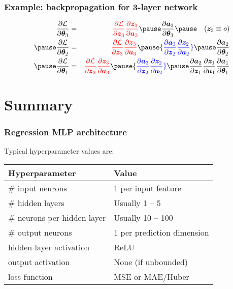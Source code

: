 \documentclass[smaller]{beamer}
\begin{document}
\begin{frame}
  \frametitle{Example: backpropagation for 3-layer network}
  \pause
{}
\pause
\vspace{-2ex}
\begin{eqnarray}
  \pd{\mc{L}}{\bm\th_{3}} &=&  {\rd \pd{\mc{L}}{\bm z_{3}}\pd{\bm z_{3}}{\bm a_{3}}}\pause \pd{\bm a_{3}}{\bm\th_{3}}
\pe \quad (\bm z_{3} \equiv o)
  \\\pause
\pd{\mc{L}}{\bm\th_{2}} &=&  {\rd \pd{\mc{L}}{\bm z_{3}}\pd{\bm z_{3}}{\bm a_{3}}} \pause {\bl \pd{\bm a_{3}}{\bm z_{2}}\pd{\bm z_{2}}{\bm a_{2}}} \pause                   
                    \pd{\bm a_{2}}{\bm\th_{2}}\\\pause  
\pd{\mc{L}}{\bm\th_{1}} &=&  {\rd \pd{\mc{L}}{\bm z_{3}}\pd{\bm z_{3}}{\bm a_{3}}} \pause {\bl \pd{\bm a_{3}}{\bm z_{2}}\pd{\bm z_{2}}{\bm a_{2}}} \pause                   
                    \pd{\bm a_{2}}{\bm z_{1}}                          
                    \pd{\bm z_{1}}{\bm a_{1}}\pd{\bm a_{1}}{\bm\th_{1}}
\end{eqnarray}
\end{frame}


\section{Summary}

\begin{frame}
  \frametitle{Regression MLP architecture}
  \pause
  Typical hyperparameter values are: \pause

  \begin{table}\centering
  \begin{tabular}[t]{l l}
    \bf Hyperparameter & \bf Value \\\midrule
    \# input neurons & 1 per input feature \\[2mm]\pause
    \# hidden layers & Usually 1 -- 5 \\[2mm]\pause
    \# neurons per hidden layer & Usually 10 -- 100 \\[2mm]\pause
    \# output neurons & 1 per prediction dimension \\[2mm]\pause
    hidden layer activation & ReLU \\[2mm]\pause
    output activation & None (if unbounded) \\[2mm]\pause
    loss function & MSE or MAE/Huber
  \end{tabular}
\end{table}
\end{frame}
\end{document}
